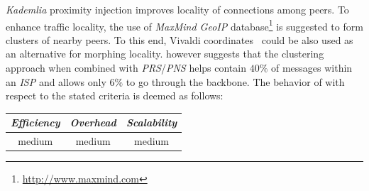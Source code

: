 
\emph{Kademlia} proximity injection improves 
locality of connections among peers.
To enhance traffic locality, the use of 
{\sl MaxMind GeoIP} database\footnote{\url{http://www.maxmind.com}} 
is suggested to form clusters of nearby peers.
To this end, Vivaldi coordinates~\cite{cox_vivaldi_2004} could be 
also used as an alternative for morphing locality. 
\cite{KLKP2008} however suggests that the clustering approach 
when combined with \emph{PRS}/\emph{PNS} helps contain 
$40\%$ of messages within an \emph{ISP} and allows only $6\%$ 
to go through the backbone.
The behavior of \cite{KLKP2008} with respect to the stated criteria is deemed as follows:
\begin{center}
{\footnotesize
\begin{tabular}{ccc}
\emph{Efficiency} & \emph{Overhead} & \emph{Scalability} \\
\hline
medium &
% 
medium &
medium
\end{tabular}
}
\end{center}



